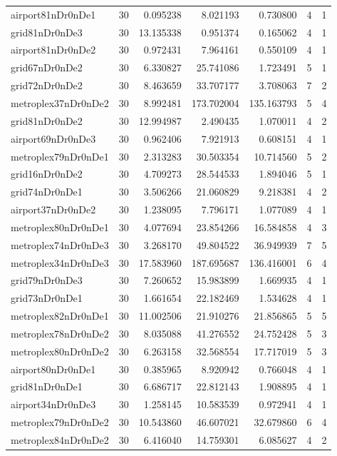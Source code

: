 \begin{longtable}{|l|r|r|r|r|r|r|}
airport81nDr0nDe1 & 30 & 0.095238 & 8.021193 & 0.730800 & 4 & 1 \\
grid81nDr0nDe3 & 30 & 13.135338 & 0.951374 & 0.165062 & 4 & 1 \\
airport81nDr0nDe2 & 30 & 0.972431 & 7.964161 & 0.550109 & 4 & 1 \\
grid67nDr0nDe2 & 30 & 6.330827 & 25.741086 & 1.723491 & 5 & 1 \\
grid72nDr0nDe2 & 30 & 8.463659 & 33.707177 & 3.708063 & 7 & 2 \\
metroplex37nDr0nDe2 & 30 & 8.992481 & 173.702004 & 135.163793 & 5 & 4 \\
grid81nDr0nDe2 & 30 & 12.994987 & 2.490435 & 1.070011 & 4 & 2 \\
airport69nDr0nDe3 & 30 & 0.962406 & 7.921913 & 0.608151 & 4 & 1 \\
metroplex79nDr0nDe1 & 30 & 2.313283 & 30.503354 & 10.714560 & 5 & 2 \\
grid16nDr0nDe2 & 30 & 4.709273 & 28.544533 & 1.894046 & 5 & 1 \\
grid74nDr0nDe1 & 30 & 3.506266 & 21.060829 & 9.218381 & 4 & 2 \\
airport37nDr0nDe2 & 30 & 1.238095 & 7.796171 & 1.077089 & 4 & 1 \\
metroplex80nDr0nDe1 & 30 & 4.077694 & 23.854266 & 16.584858 & 4 & 3 \\
metroplex74nDr0nDe3 & 30 & 3.268170 & 49.804522 & 36.949939 & 7 & 5 \\
metroplex34nDr0nDe3 & 30 & 17.583960 & 187.695687 & 136.416001 & 6 & 4 \\
grid79nDr0nDe3 & 30 & 7.260652 & 15.983899 & 1.669935 & 4 & 1 \\
grid73nDr0nDe1 & 30 & 1.661654 & 22.182469 & 1.534628 & 4 & 1 \\
metroplex82nDr0nDe1 & 30 & 11.002506 & 21.910276 & 21.856865 & 5 & 5 \\
metroplex78nDr0nDe2 & 30 & 8.035088 & 41.276552 & 24.752428 & 5 & 3 \\
metroplex80nDr0nDe2 & 30 & 6.263158 & 32.568554 & 17.717019 & 5 & 3 \\
airport80nDr0nDe1 & 30 & 0.385965 & 8.920942 & 0.766048 & 4 & 1 \\
grid81nDr0nDe1 & 30 & 6.686717 & 22.812143 & 1.908895 & 4 & 1 \\
airport34nDr0nDe3 & 30 & 1.258145 & 10.583539 & 0.972941 & 4 & 1 \\
metroplex79nDr0nDe2 & 30 & 10.543860 & 46.607021 & 32.679860 & 6 & 4 \\
metroplex84nDr0nDe2 & 30 & 6.416040 & 14.759301 & 6.085627 & 4 & 2 \\

\end{longtable}
